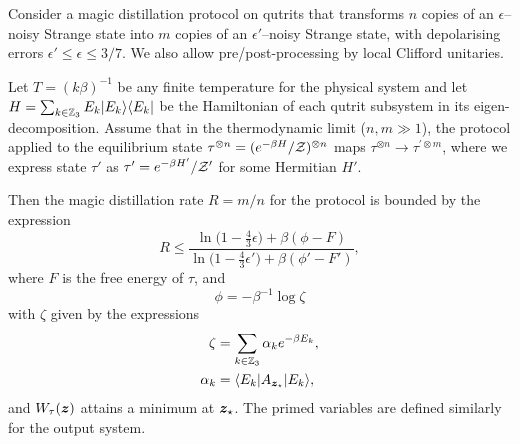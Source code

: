 \documentclass[pra,
aps,
twocolumn,
superscriptaddress,
groupedaddress,
nofootinbib,
reprint
]{revtex4-1}
\begin{document}
\begingroup
\def\thetheorem{\ref{thm:free-energy}}
\begin{theorem}
	Consider a magic distillation protocol on qutrits that transforms $n$ copies of an $\epsilon$--noisy Strange state into $m$ copies of an $\epsilon'$--noisy Strange state, with depolarising errors $\epsilon' \leq \epsilon \leq 3/7$. We also allow pre/post-processing by local Clifford unitaries.
	
	Let $T =(k\beta)^{-1}$ be any finite temperature for the physical system and let $H= \sum_{k \in \mathbb{Z}_3} E_k |E_k\rangle\langle E_k|$ be the Hamiltonian of each qutrit subsystem in its eigen-decomposition.
Assume that in the thermodynamic limit ($n,m \gg 1$), the protocol applied to the equilibrium state $\tau^{\otimes n} = (e^{-\beta H}/\mathcal{Z})^{\otimes n}$ maps $\tau^{\otimes n} \longrightarrow \tau^{\prime \otimes m}$, where we express state $\tau'$ as $\tau' = e^{-\beta H'}/\mathcal{Z}'$ for some Hermitian $H'$.

Then the magic distillation rate $R = m/n$ for the protocol is bounded by the expression
\begin{equation}
	R \leq \dfrac{\ln{\big( 1-\frac{4}{3}\epsilon \big)} + \beta (\phi - F)}{\ln{\big( 1-\frac{4}{3}\epsilon' \big)} + \beta (\phi' - F')},
\end{equation}
where $F$ is the free energy of $\tau$,  and 
\begin{equation}
	\phi = -\beta^{-1} \log \zeta
\end{equation}
with $\zeta$ given by the expressions
\begin{align}
	\zeta &= \sum_{k\in \mathbb{Z}_3} \alpha_k e^{-\beta E_k}, \nonumber\\
	\alpha_k &= \langle E_k| A_{\bm{z}_\star} |E_k\rangle,
\end{align}
and $W_\tau(\bm{z})$ attains a minimum at $\boldsymbol{z}_\star$. The primed variables are defined similarly for the output system.
\end{theorem}
\addtocounter{theorem}{-1}
\endgroup
\end{document}
